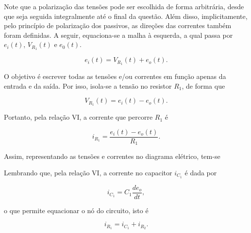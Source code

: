 \documentclass{article}
\numberwithin{equation}{section}
\begin{document}
\noindent Note que a polarização das tensões pode ser escolhida de forma arbitrária, desde que seja seguida integralmente até o final da questão. Além disso, implicitamente, pelo princípio de polarização dos passivos, as direções das correntes também foram definidas. A seguir, equaciona-se a malha à esquerda, a qual passa por $e_i(t)$, $V_{R_1}(t)$ e $e_0(t)$.

\begin{equation*}
    e_{i}(t) = V_{R_{1}}(t) + e_{o}(t).
\end{equation*}

\noindent O objetivo é escrever todas as tensões e/ou correntes em função apenas da entrada e da saída. Por isso, isola-se a tensão no resistor $R_1$, de forma que

\begin{equation*}
    V_{R_{1}}(t) = e_{i}(t) - e_{o}(t).
\end{equation*}

\noindent Portanto, pela relação VI, a corrente que percorre $R_1$ é

\begin{equation}
    i_{R_1} = \dfrac{e_i(t)-e_o(t)}{R_1}. \label{eq:ex_ir1}
\end{equation}

\noindent Assim, representando as tensões e correntes no diagrama elétrico, tem-se

\begin{center}
\end{center}

\noindent Lembrando que, pela relação VI, a corrente no capacitor $i_{C_1}$ é dada por

\begin{equation}
    i_{C_1} = C_1 \dfrac{de_o}{dt}, \label{eq:ex_ic1}
\end{equation}

\noindent o que permite equacionar o nó do circuito, isto é

\begin{equation*}
    i_{R_1} = i_{C_1} + i_{R_2}.
\end{equation*}
\end{document}
